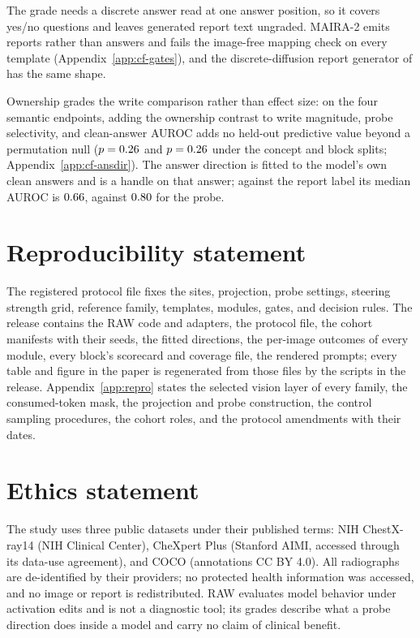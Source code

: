 \documentclass[11pt]{article}
\begin{document}
The grade needs a discrete answer read at one answer position, so it covers yes/no questions and leaves generated report text ungraded. MAIRA-2 \citep{bannur2024maira} emits reports rather than answers and fails the image-free mapping check on every template (Appendix~\ref{app:cf-gates}), and the discrete-diffusion report generator of \citet{chen2026echo} has the same shape.

Ownership grades the write comparison rather than effect size: on the four semantic endpoints, adding the ownership contrast to write magnitude, probe selectivity, and clean-answer AUROC adds no held-out predictive value beyond a permutation null ($p=0.26$ and $p=0.26$ under the concept and block splits; Appendix~\ref{app:cf-ansdir}). The answer direction is fitted to the model's own clean answers and is a handle on that answer; against the report label its median AUROC is $0.66$, against $0.80$ for the probe.

\section*{Reproducibility statement}
The registered protocol file fixes the sites, projection, probe settings, steering strength grid, reference family, templates, modules, gates, and decision rules. The release contains the RAW code and adapters, the protocol file, the cohort manifests with their seeds, the fitted directions, the per-image outcomes of every module, every block's scorecard and coverage file, the rendered prompts; every table and figure in the paper is regenerated from those files by the scripts in the release. Appendix~\ref{app:repro} states the selected vision layer of every family, the consumed-token mask, the projection and probe construction, the control sampling procedures, the cohort roles, and the protocol amendments with their dates.

\section*{Ethics statement}
The study uses three public datasets under their published terms: NIH ChestX-ray14 (NIH Clinical Center), CheXpert Plus (Stanford AIMI, accessed through its data-use agreement), and COCO (annotations CC BY 4.0). All radiographs are de-identified by their providers; no protected health information was accessed, and no image or report is redistributed. RAW evaluates model behavior under activation edits and is not a diagnostic tool; its grades describe what a probe direction does inside a model and carry no claim of clinical benefit.
\end{document}
